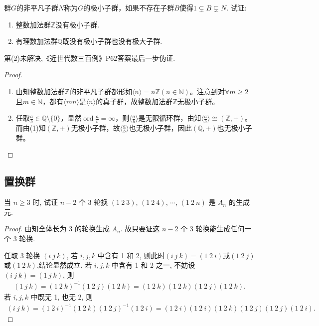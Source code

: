 \documentclass[../../main.tex]{subfiles}%
\begin{document}
\begin{example}
群$G$的非平凡子群$N$称为$G$的极小子群，如果不存在子群$B$使得$1 \subsetneq B \subsetneq N$. 试证:
\begin{enumerate}[(1)]
\item 整数加法群$\mathbb{Z}$没有极小子群.

\item 有理数加法群$\mathbb{Q}$既没有极小子群也没有极大子群.
\end{enumerate}
\end{example}
\begin{remark}
第(2)未解决,《近世代数三百例》P62答案最后一步伪证.
\end{remark}
\begin{proof}
\begin{enumerate}[(1)]
\item 由知整数加法群$\mathbb{Z}$的非平凡子群都形如$\langle n \rangle =n\mathbb{Z} \left( n\in \mathbb{N} \right)$。注意到对$\forall m\geqslant 2$且$m\in \mathbb{N}$，都有$\langle mn \rangle$是$\langle n \rangle$的真子群，故整数加法群$\mathbb{Z}$无极小子群。

\item 任取$\frac{a}{b}\in \mathbb{Q} \setminus \{ 0 \}$，显然$\operatorname{ord}\frac{a}{b}=\infty$，则$\langle \frac{a}{b} \rangle$是无限循环群，由知$\langle \frac{a}{b} \rangle \cong (\mathbb{Z},+)$。而由(1)知$(\mathbb{Z},+)$无极小子群，故$\langle \frac{a}{b} \rangle$也无极小子群，因此$(\mathbb{Q},+)$也无极小子群。


\end{enumerate}
\end{proof}



\subsection{置换群}

\begin{example}
当 $n\geqslant 3$ 时, 试证 $n-2$ 个 3 轮换 $(1\ 2\ 3)$, $(1\ 2\ 4)$, $\cdots$, $(1\ 2\ n)$ 是 $A_n$ 的生成元.
\end{example}
\begin{proof}
由知全体长为 3 的轮换生成 $A_n$. 故只要证这 $n-2$ 个 3 轮换能生成任何一个 3 轮换.

任取 3 轮换 $(i\ j\ k)$, 若 $i,j,k$ 中含有 1 和 2, 则此时$(i\ j\ k)=(1\ 2\ i)$或$(1\ 2\ j)$或$(1\ 2\ k)$,结论显然成立. 若 $i,j,k$ 中含有 1 和 2 之一, 不妨设 $(i\ j\ k)=(1\ j\ k)$, 则
\begin{align*}
(1\ j\ k)=(1\ 2\ k)^{-1}(1\ 2\ j)(1\ 2\ k)=(1\ 2\ k)(1\ 2\ k)(1\ 2\ j)(1\ 2\ k).
\end{align*}
若 $i,j,k$ 中既无 1, 也无 2, 则
\begin{align*}
(i\ j\ k)=(1\ 2\ i)^{-1}(1\ 2\ k)(1\ 2\ j)^{-1}(1\ 2\ i)=(1\ 2\ i)(1\ 2\ i)(1\ 2\ k)(1\ 2\ j)(1\ 2\ j)(1\ 2\ i).
\end{align*}
\end{proof}
\end{document}
